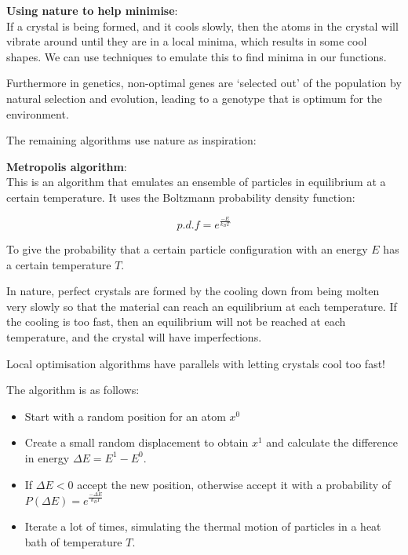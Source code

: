 \begin{description}
  \item \textbf{Using nature to help minimise}:\\
  If a crystal is being formed, and it cools slowly, then the atoms in the
  crystal will vibrate around until they are in a local minima, which results in
  some cool shapes. We can use techniques to emulate this to find minima in our
  functions.

  Furthermore in genetics, non-optimal genes are `selected out' of the
  population by natural selection and evolution, leading to a genotype that is
  optimum for the environment.

  The remaining algorithms use nature as inspiration:

  \begin{description}
    \item \textbf{Metropolis algorithm}:\\
      This is an algorithm that emulates an ensemble of particles in equilibrium
      at a certain temperature. It uses the Boltzmann probability density
      function:

      \[
        p.d.f = e^{\frac{-E}{k_BT}}
      \]

      To give the probability that a certain particle configuration with an 
      energy $E$ has a certain temperature $T$.

      In nature, perfect crystals are formed by the cooling down from being
      molten very slowly so that the material can reach an equilibrium at each
      temperature. If the cooling is too fast, then an equilibrium will not be
      reached at each temperature, and the crystal will have imperfections.

      Local optimisation algorithms have parallels with letting crystals cool
      too fast!

      The algorithm is as follows:

      \begin{itemize}
        \item Start with a random position for an atom $x^0$
        \item Create a small random displacement to obtain $x^1$ and calculate
        the difference in energy $\Delta E = E^1 - E^0$.
        \item If $\Delta E < 0$ accept the new position, otherwise accept it
        with a probability of $P(\Delta E) = e^{\frac{-\Delta E}{k_BT}}$
        \item Iterate a lot of times, simulating the thermal motion of particles 
        in a heat bath of temperature $T$.
      \end{itemize}


\end{description}
\end{description}
